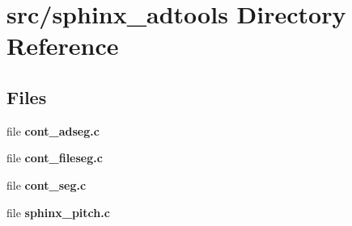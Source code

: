 \section{src/sphinx\-\_\-adtools Directory Reference}
\label{dir_626a4c20570d8d1011e4cc5b6ee6b8c0}
\subsection*{Files}
\begin{DoxyCompactItemize}
\item 
file {\bfseries cont\-\_\-adseg.\-c}
\item 
file {\bfseries cont\-\_\-fileseg.\-c}
\item 
file {\bfseries cont\-\_\-seg.\-c}
\item 
file {\bfseries sphinx\-\_\-pitch.\-c}
\end{DoxyCompactItemize}
